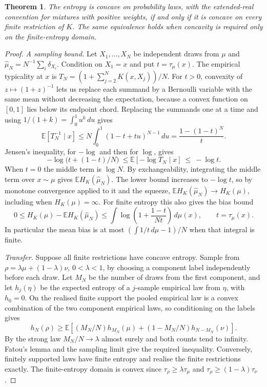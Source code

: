 \documentclass[11pt,a4paper]{article}
\newtheorem{theorem}{Theorem}
\theoremstyle{remark}
\begin{document}
\begin{theorem}\label{thm:restriction}
The entropy is concave on probability laws, with the extended-real convention for mixtures with positive weights, if and only if it is concave on every finite restriction of $K$. The same equivalence holds when concavity is required only on the finite-entropy domain.
\end{theorem}

\begin{proof}
\emph{A sampling bound.} Let $X_1,\ldots,X_N$ be independent draws from $\mu$ and $\widehat\mu_N=N^{-1}\sum_i\delta_{X_i}$. Condition on $X_1=x$ and put $t=\tau_\mu(x)$. The empirical typicality at $x$ is $T_N=(1+\sum_{j=2}^N K(x,X_j))/N$. For $t>0$, convexity of $z\mapsto(1+z)^{-1}$ lets us replace each summand by a Bernoulli variable with the same mean without decreasing the expectation, because a convex function on $[0,1]$ lies below its endpoint chord. Replacing the summands one at a time and using $1/(1+k)=\int_0^1 u^k\,du$ gives
\[
 \mathbb E[T_N^{-1}\mid x]\le
 N\int_0^1(1-t+tu)^{N-1}\,du=\frac{1-(1-t)^N}{t}.
\]
Jensen's inequality, for $-\log$ and then for $\log$, gives
\[
 -\log\bigl(t+(1-t)/N\bigr)\ \le \mathbb E[-\log T_N\mid x]\ \le\ -\log t .
\]
When $t=0$ the middle term is $\log N$. By exchangeability, integrating the middle term over $x\sim\mu$ gives $\mathbb E H_K(\widehat\mu_N)$. The lower bound increases to $-\log t$, so by monotone convergence applied to it and the squeeze, $\mathbb E H_K(\widehat\mu_N)\to H_K(\mu)$, including when $H_K(\mu)=\infty$. For finite entropy this also gives the bias bound
\[
 0\le H_K(\mu)-\mathbb E H_K(\widehat\mu_N)
 \le\int\log\!\left(1+\frac{1-t}{Nt}\right)\,d\mu(x),
 \qquad t=\tau_\mu(x).
\]
In particular the mean bias is at most $(\int 1/t\,d\mu-1)/N$ when that integral is finite.

\emph{Transfer.} Suppose all finite restrictions have concave entropy. Sample from $\rho=\lambda\mu+(1-\lambda)\nu$, $0<\lambda<1$, by choosing a component label independently before each draw. Let $M_N$ be the number of draws from the first component, and let $h_j(\eta)$ be the expected entropy of a $j$-sample empirical law from $\eta$, with $h_0=0$. On the realised finite support the pooled empirical law is a convex combination of the two component empirical laws, so conditioning on the labels gives
\[
 h_N(\rho)\ge \mathbb E\!\left[
  (M_N/N) h_{M_N}(\mu)+(1-M_N/N) h_{N-M_N}(\nu)\right].
\]
By the strong law $M_N/N\to\lambda$ almost surely and both counts tend to infinity. Fatou's lemma and the sampling limit give the required inequality. Conversely, finitely supported laws have finite entropy and realise the finite restrictions exactly. The finite-entropy domain is convex since $\tau_\rho\ge\lambda\tau_\mu$ and $\tau_\rho\ge(1-\lambda)\tau_\nu$.
\end{proof}
\end{document}
